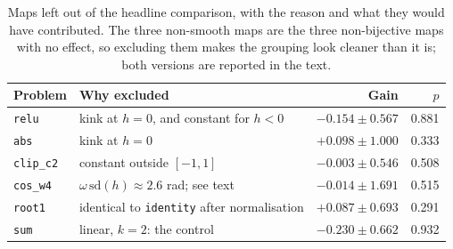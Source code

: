 \begin{table}[H]
\centering
\small
\caption{Maps left out of the headline comparison, with the reason and what they would have contributed. The three non-smooth maps are the three non-bijective maps with no effect, so excluding them makes the grouping look cleaner than it is; both versions are reported in the text.}
\label{tab:excluded}
\begin{tabular}{l l r r}
\toprule
Problem & Why excluded & Gain & $p$ \\
\midrule
\texttt{relu} & kink at $h=0$, and constant for $h<0$ & $-0.154\pm0.567$ & 0.881 \\
\texttt{abs} & kink at $h=0$ & $+0.098\pm1.000$ & 0.333 \\
\texttt{clip\_c2} & constant outside $[-1,1]$ & $-0.003\pm0.546$ & 0.508 \\
\texttt{cos\_w4} & $\omega\,\mathrm{sd}(h)\approx2.6$ rad; see text & $-0.014\pm1.691$ & 0.515 \\
\texttt{root1} & identical to \texttt{identity} after normalisation & $+0.087\pm0.693$ & 0.291 \\
\midrule
\texttt{sum} & linear, $k=2$: the control & $-0.230\pm0.662$ & 0.932 \\
\bottomrule
\end{tabular}
\end{table}
